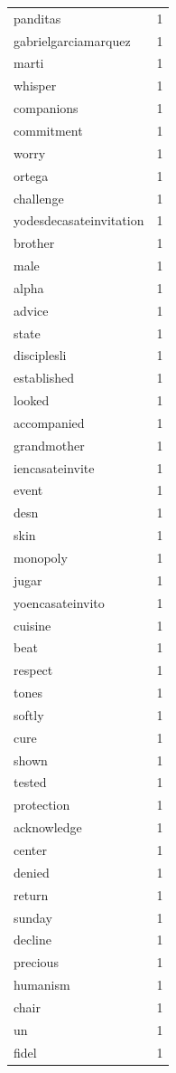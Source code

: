 \begin{tabular}{lr}
panditas & 1 \\
gabrielgarciamarquez & 1 \\
marti & 1 \\
whisper & 1 \\
companions & 1 \\
commitment & 1 \\
worry & 1 \\
ortega & 1 \\
challenge & 1 \\
yodesdecasateinvitation & 1 \\
brother & 1 \\
male & 1 \\
alpha & 1 \\
advice & 1 \\
state & 1 \\
disciplesli & 1 \\
established & 1 \\
looked & 1 \\
accompanied & 1 \\
grandmother & 1 \\
iencasateinvite & 1 \\
event & 1 \\
desn & 1 \\
skin & 1 \\
monopoly & 1 \\
jugar & 1 \\
yoencasateinvito & 1 \\
cuisine & 1 \\
beat & 1 \\
respect & 1 \\
tones & 1 \\
softly & 1 \\
cure & 1 \\
shown & 1 \\
tested & 1 \\
protection & 1 \\
acknowledge & 1 \\
center & 1 \\
denied & 1 \\
return & 1 \\
sunday & 1 \\
decline & 1 \\
precious & 1 \\
humanism & 1 \\
chair & 1 \\
un & 1 \\
fidel & 1 \\

\end{tabular}
